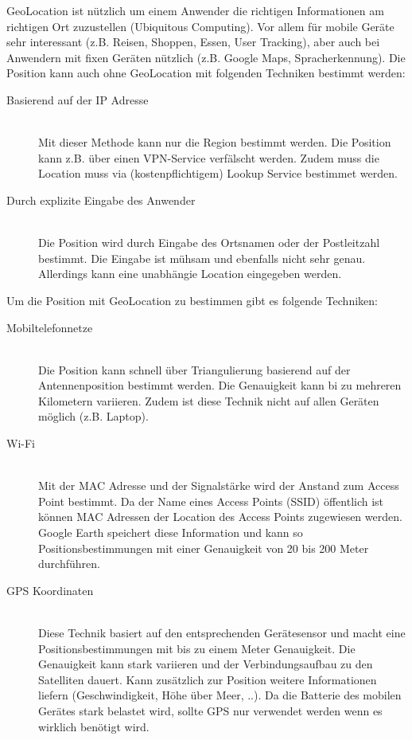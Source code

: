 GeoLocation ist nützlich um einem Anwender die richtigen Informationen am richtigen Ort zuzustellen (Ubiquitous Computing). Vor allem für mobile Geräte sehr interessant (z.B. Reisen, Shoppen, Essen, User Tracking), aber auch bei Anwendern mit fixen Geräten nützlich (z.B. Google Maps, Spracherkennung). Die Position kann auch ohne GeoLocation mit folgenden Techniken bestimmt werden:
\begin{description}
	\item[Basierend auf der IP Adresse] \hfil \\
	Mit dieser Methode kann nur die Region bestimmt werden. Die Position kann z.B. über einen VPN-Service verfälscht werden. Zudem muss die Location muss via (kostenpflichtigem) Lookup Service bestimmet werden.
	\item[Durch explizite Eingabe des Anwender] \hfil \\
	Die Position wird durch Eingabe des Ortsnamen oder der Postleitzahl bestimmt. Die Eingabe ist mühsam und ebenfalls nicht sehr genau. Allerdings kann eine unabhängie Location eingegeben werden.
\end{description}
Um die Position mit GeoLocation zu bestimmen gibt es folgende Techniken:
\begin{description}
	\item[Mobiltelefonnetze] \hfil \\
	Die Position kann schnell über Triangulierung basierend auf der Antennenposition bestimmt werden. Die Genauigkeit kann bi zu mehreren Kilometern variieren. Zudem ist diese Technik nicht auf allen Geräten möglich (z.B. Laptop).
	\item[Wi-Fi] \hfil \\
	Mit der MAC Adresse und der Signalstärke wird der Anstand zum Access Point bestimmt. Da der Name eines Access Points (SSID) öffentlich ist können MAC Adressen der Location des Access Points zugewiesen werden. Google Earth speichert diese Information und kann so Positionsbestimmungen mit einer Genauigkeit von 20 bis 200 Meter durchführen.
	\item[GPS Koordinaten] \hfil \\
	Diese Technik basiert auf den entsprechenden Gerätesensor und macht eine Positionsbestimmungen mit bis zu einem Meter Genauigkeit. Die Genauigkeit kann stark variieren und der Verbindungsaufbau zu den Satelliten dauert. Kann zusätzlich zur Position weitere Informationen liefern (Geschwindigkeit, Höhe über Meer, ..). Da die Batterie des mobilen Gerätes stark belastet wird, sollte GPS nur verwendet werden wenn es wirklich benötigt wird.
\end{description}

